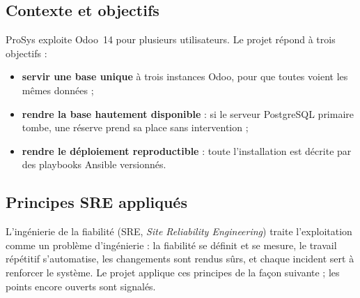 \documentclass[11pt,a4paper]{article}
\begin{document}
\subsection{Contexte et objectifs}

ProSys exploite Odoo~14 pour plusieurs utilisateurs. Le projet répond à trois
objectifs :

\begin{itemize}
  \item \textbf{servir une base unique} à trois instances Odoo, pour que toutes
        voient les mêmes données ;
  \item \textbf{rendre la base hautement disponible} : si le serveur
        PostgreSQL primaire tombe, une réserve prend sa place sans intervention ;
  \item \textbf{rendre le déploiement reproductible} : toute l'installation est
        décrite par des playbooks Ansible versionnés.
\end{itemize}

\subsection{Principes SRE appliqués}

L'ingénierie de la fiabilité (SRE, \emph{Site Reliability Engineering}) traite
l'exploitation comme un problème d'ingénierie : la fiabilité se définit et se
mesure, le travail répétitif s'automatise, les changements sont rendus sûrs, et
chaque incident sert à renforcer le système. Le projet applique ces principes
de la façon suivante ; les points encore ouverts sont signalés.
\end{document}
